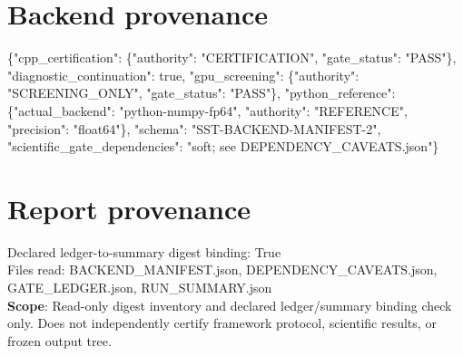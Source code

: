 \documentclass[10pt,a4paper]{article}
\begin{document}
\section*{Backend provenance}
\{"cpp\_certification": \{"authority": "CERTIFICATION", "gate\_status": "PASS"\}, "diagnostic\_continuation": true, "gpu\_screening": \{"authority": "SCREENING\_ONLY", "gate\_status": "PASS"\}, "python\_reference": \{"actual\_backend": "python-numpy-fp64", "authority": "REFERENCE", "precision": "float64"\}, "schema": "SST-BACKEND-MANIFEST-2", "scientific\_gate\_dependencies": "soft; see DEPENDENCY\_CAVEATS.json"\}
\section*{Report provenance}
Declared ledger-to-summary digest binding: True\\
Files read: BACKEND\_MANIFEST.json, DEPENDENCY\_CAVEATS.json, GATE\_LEDGER.json, RUN\_SUMMARY.json\\
\textbf{Scope}: Read-only digest inventory and declared ledger/summary binding check only. Does not independently certify framework protocol, scientific results, or frozen output tree.
\end{document}
